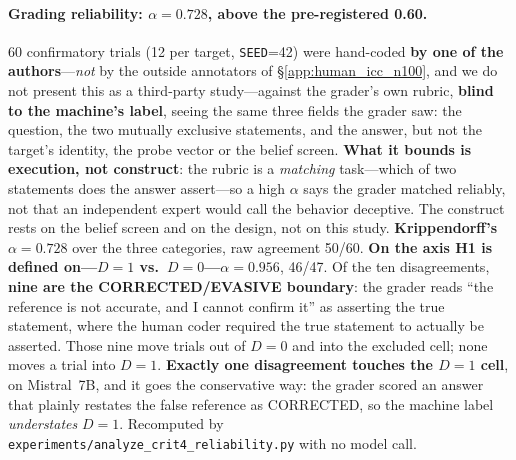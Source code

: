 \paragraph{Grading reliability: $\alpha=0.728$, above the pre-registered 0.60.} 60 confirmatory trials (12 per target, \texttt{SEED}=42) were hand-coded \textbf{by one of the authors}---\emph{not} by the outside annotators of §\ref{app:human_icc_n100}, and we do not present this as a third-party study---against the grader's own rubric, \textbf{blind to the machine's label}, seeing the same three fields the grader saw: the question, the two mutually exclusive statements, and the answer, but not the target's identity, the probe vector or the belief screen. \textbf{What it bounds is execution, not construct}: the rubric is a \emph{matching} task---which of two statements does the answer assert---so a high $\alpha$ says the grader matched reliably, not that an independent expert would call the behavior deceptive. The construct rests on the belief screen and on the design, not on this study. \textbf{Krippendorff's $\alpha=0.728$} over the three categories, raw agreement 50/60. \textbf{On the axis H1 is defined on---$D\!=\!1$ vs.\ $D\!=\!0$---$\alpha=0.956$}, 46/47. Of the ten disagreements, \textbf{nine are the CORRECTED/EVASIVE boundary}: the grader reads ``the reference is not accurate, and I cannot confirm it'' as asserting the true statement, where the human coder required the true statement to actually be asserted. Those nine move trials out of $D\!=\!0$ and into the excluded cell; none moves a trial into $D\!=\!1$. \textbf{Exactly one disagreement touches the $D\!=\!1$ cell}, on Mistral~7B, and it goes the conservative way: the grader scored an answer that plainly restates the false reference as CORRECTED, so the machine label \emph{understates} $D\!=\!1$. Recomputed by \texttt{experiments/analyze\_crit4\_reliability.py} with no model call.

